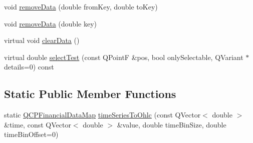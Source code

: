 \begin{DoxyCompactItemize}
\item 
void \hyperlink{classQCPFinancial_a048c741d3c8cc5709c2c44b759fdf27c}{remove\+Data} (double from\+Key, double to\+Key)
\item 
void \hyperlink{classQCPFinancial_ae527d8a11290906b083d1ab598c380ea}{remove\+Data} (double key)
\item 
virtual void \hyperlink{classQCPFinancial_a11fd49928c33e55e27b7319c6927864a}{clear\+Data} ()
\item 
virtual double \hyperlink{classQCPFinancial_adf6cff00a55f775487d375fe4df5e95b}{select\+Test} (const Q\+PointF \&pos, bool only\+Selectable, Q\+Variant $\ast$details=0) const 
\end{DoxyCompactItemize}
\subsection*{Static Public Member Functions}
\begin{DoxyCompactItemize}
\item 
static \hyperlink{qcustomplot_8h_a745c09823fae0974b50beca9bc3b3d7d}{Q\+C\+P\+Financial\+Data\+Map} \hyperlink{classQCPFinancial_a0c3453d1c03e320950fdd2df54e3ebc8}{time\+Series\+To\+Ohlc} (const Q\+Vector$<$ double $>$ \&time, const Q\+Vector$<$ double $>$ \&value, double time\+Bin\+Size, double time\+Bin\+Offset=0)
\end{DoxyCompactItemize}

